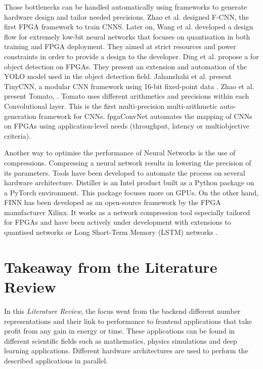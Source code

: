 Those bottlenecks can be handled automatically using frameworks to generate hardware design and tailor needed precisions. Zhao et al. \cite{Zhao2016} designed F-CNN, the first FPGA framework to train CNNS. Later on, Wang et al. \cite{Wang2018} developed a design flow for extremely low-bit neural networks that focuses on quantisation in both training and FPGA deployment. They aimed at strict resources and power constraints in order to provide a design to the developer. Ding et al. \cite{Ding2019} propose a  for object detection on FPGAs. They present an extension and automation of the YOLO model used in the object detection field. Jahanshahi et al. \cite{Jahanshahi2019} present TinyCNN, a modular CNN framework using 16-bit fixed-point data . Zhao et al. \cite{Zhao2019} present Tomato, . Tomato uses different arithmetics and precisions within each Convolutional layer. This is the first multi-precision multi-arithmetic auto-generation framework for CNNs. fpgaConvNet \cite{Venieris2017} automates the mapping of CNNs on FPGAs using application-level needs (throughput, latency or multiobjective criteria).

Another way to optimise the performance of Neural Networks is the use of compressions. Compressing a neural network results in lowering the precision of its parameters. Tools have been developed to automate the process on several hardware architecture. Distiller is an Intel product built as a Python package on a PyTorch environment. This package focuses more on GPUs. On the other hand, FINN \cite{Umuroglu2017} has been developed as an open-source framework by the FPGA manufacturer Xilinx. It works as a network compression tool especially tailored for FPGAs and have been actively under development with extensions to quantised networks \cite{Blott2018} or Long Short-Term Memory (LSTM) networks \cite{Rybalkin2018}.

\section{Takeaway from the Literature Review}
In this \emph{Literature Review}, the focus went from the backend different number representations and their link to performance to frontend applications that take profit from any gain in energy or time. These applications can be found in different scientific fields such as mathematics, physics simulations and deep learning applications. Different hardware architectures are used to perform the described applications in parallel.

